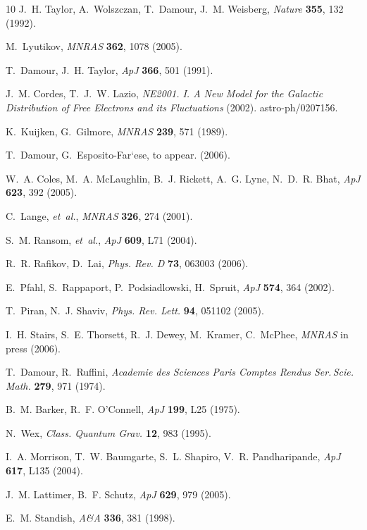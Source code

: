 \documentclass[12pt,psfig]{article}
\begin{document}
\begin{thebibliography}{10}
J.~H. Taylor, A.~Wolszczan, T.~Damour, J.~M. Weisberg, {\it Nature\/} {\bf
  355}, 132 (1992).

M.~{Lyutikov}, {\it MNRAS\/} {\bf 362}, 1078 (2005).

T.~Damour, J.~H. Taylor, {\it ApJ\/} {\bf 366}, 501 (1991).

J.~M. {Cordes}, T.~J.~W. {Lazio}, 
{\it NE2001. I. A New Model for the Galactic Distribution
  of Free Electrons and its Fluctuations} (2002). {astro-ph/0207156}.

K.~Kuijken, G.~Gilmore, {\it MNRAS\/} {\bf 239}, 571 (1989).

T.~Damour, G.~Esposito-Far`ese, to appear. (2006).

W.~A. Coles, M.~A. McLaughlin, B.~J. Rickett, A.~G. Lyne, N.~D.~R. Bhat, {\it
  ApJ\/} {\bf 623}, 392 (2005).

C.~Lange, {\it et~al.\/}, {\it MNRAS\/} {\bf 326}, 274 (2001).

S.~M. Ransom, {\it et~al.\/}, {\it ApJ\/} {\bf 609}, L71 (2004).

R.~R. {Rafikov}, D.~{Lai}, {\it Phys. Rev. D\/} {\bf 73}, 063003 (2006).

E.~{Pfahl}, S.~{Rappaport}, P.~{Podsiadlowski}, H.~{Spruit}, {\it ApJ\/} {\bf
  574}, 364 (2002).

T.~{Piran}, N.~J. {Shaviv}, {\it Phys. Rev. Lett.\/} {\bf 94}, 051102 (2005).

I.~H. Stairs, S.~E. Thorsett, R.~J. Dewey, M.~Kramer, C.~McPhee, {\it MNRAS\/}
  in press (2006).

T.~Damour, R.~Ruffini, {\it Academie des Sciences Paris Comptes Rendus
  Ser.\,Scie.\,Math.\/} {\bf 279}, 971 (1974).

B.~M. Barker, R.~F. O'Connell, {\it ApJ\/} {\bf 199}, L25 (1975).

N.~Wex, {\it Class. Quantum Grav.\/} {\bf 12}, 983 (1995).

I.~A. {Morrison}, T.~W. {Baumgarte}, S.~L. {Shapiro}, V.~R. {Pandharipande},
  {\it ApJ\/} {\bf 617}, L135 (2004).

J.~M. {Lattimer}, B.~F. {Schutz}, {\it ApJ\/} {\bf 629}, 979 (2005).


E.~M. {Standish}, {\it A\&A\/} {\bf 336}, 381 (1998).

\end{thebibliography}
\end{document}
